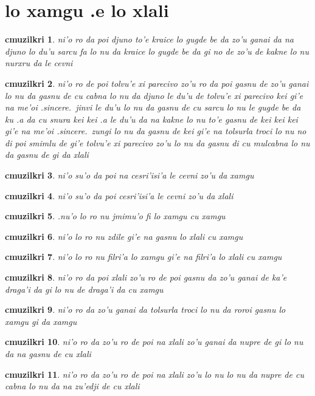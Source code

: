 \documentclass{report}
\newtheorem{cmuzilkri}{cmuzilkri}
\begin{document}
\section{lo xamgu .e lo xlali}
\begin{cmuzilkri}
	ni'o ro da poi djuno to'e kraice lo gugde be da zo'u ganai da na djuno lo du'u sarcu fa lo nu da kraice lo gugde be da gi no de zo'u de kakne lo nu nurxru da le cevni
\end{cmuzilkri}
\begin{cmuzilkri}
	ni'o ro de poi tolvu'e xi parecivo zo'u ro da poi gasnu de zo'u ganai lo nu da gasnu de cu cabna lo nu da djuno le du'u de tolvu'e xi parecivo kei gi'e na me'oi .sincere.\ jinvi le du'u lo nu da gasnu de cu sarcu lo nu le gugde be da ku .a da cu snura kei kei .a le du'u da na kakne lo nu to'e gasnu de kei kei kei gi'e na me'oi .sincere.\ zungi lo nu da gasnu de kei gi'e na tolsurla troci lo nu no di poi smimlu de gi'e tolvu'e xi parecivo zo'u lo nu da gasnu di cu mulcabna lo nu da gasnu de gi da xlali
\end{cmuzilkri}
\begin{cmuzilkri}
	ni'o su'o da poi na cesri'isi'a le cevni zo'u da xamgu
\end{cmuzilkri}
\begin{cmuzilkri}
	ni'o su'o da poi cesri'isi'a le cevni zo'u da xlali
\end{cmuzilkri}
\begin{cmuzilkri}
       .nu'o lo ro nu jmimu'o fi lo xamgu cu xamgu
\end{cmuzilkri}
\begin{cmuzilkri}
	ni'o lo ro nu zdile gi'e na gasnu lo xlali cu xamgu
\end{cmuzilkri}
\begin{cmuzilkri}
	ni'o lo ro nu filri'a lo xamgu gi'e na filri'a lo xlali cu xamgu
\end{cmuzilkri}
\begin{cmuzilkri}
	ni'o ro da poi xlali zo'u ro de poi gasnu da zo'u ganai de ka'e draga'i da gi lo nu de draga'i da cu xamgu
\end{cmuzilkri}
\begin{cmuzilkri}
	ni'o ro da zo'u ganai da tolsurla troci lo nu da roroi gasnu lo xamgu gi da xamgu
\end{cmuzilkri}
\begin{cmuzilkri}
	ni'o ro da zo'u ro de poi na xlali zo'u ganai da nupre de gi lo nu da na gasnu de cu xlali
\end{cmuzilkri}
\begin{cmuzilkri}
	ni'o ro da zo'u ro de poi na xlali zo'u lo nu lo nu da nupre de cu cabna lo nu da na zu'edji de cu xlali
\end{cmuzilkri}
\end{document}
